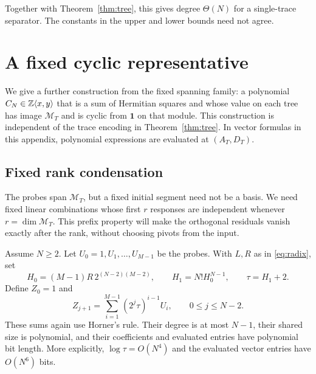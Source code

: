 \documentclass[11pt,letterpaper]{article}
\theoremstyle{definition}\newtheorem{definition}[theorem]{Definition}
\theoremstyle{remark}\newtheorem{remark}[theorem]{Remark}
\newcommand{\one}{\mathbf1}\newcommand{\M}{\mathcal M}
\begin{document}
Together with Theorem~\ref{thm:tree}, this gives degree $\Theta(N)$ for a single-trace separator. The constants in the upper and lower bounds need not agree.

\appendix
\section{A fixed cyclic representative}\label{sec:cyclic}
We give a further construction from the fixed spanning family: a polynomial $C_N\in\mathbb Z\langle x,y\rangle$ that is a sum of Hermitian squares and whose value on each tree has image $\M_T$ and is cyclic from $\one$ on that module. This construction is independent of the trace encoding in Theorem~\ref{thm:tree}. In vector formulas in this appendix, polynomial expressions are evaluated at $(A_T,D_T)$.

\subsection{Fixed rank condensation}
The probes span $\M_T$, but a fixed initial segment need not be a basis.
We need fixed linear combinations whose first $r$ responses are independent
whenever $r=\dim\M_T$. This prefix property will make the orthogonal residuals
vanish exactly after the rank, without choosing pivots from the input.

Assume $N\ge2$. Let $U_0=1,U_1,\ldots,U_{M-1}$ be the probes. With $L,R$ as in \eqref{eq:radix}, set
\[
H_0=(M-1)R\,2^{(N-2)(M-2)},\qquad
H_1=N!H_0^{N-1},\qquad \tau=H_1+2.
\]
Define $Z_0=1$ and
\begin{equation}\label{eq:folded}
Z_{j+1}=\sum_{i=1}^{M-1}(2^j\tau)^{i-1}U_i,
\qquad 0\le j\le N-2.
\end{equation}
These sums again use Horner's rule. Their degree is at most $N-1$, their shared size is polynomial, and their coefficients and evaluated entries have polynomial bit length. More explicitly, $\log\tau=O(N^4)$ and the evaluated vector entries have $O(N^6)$ bits.
\end{document}
